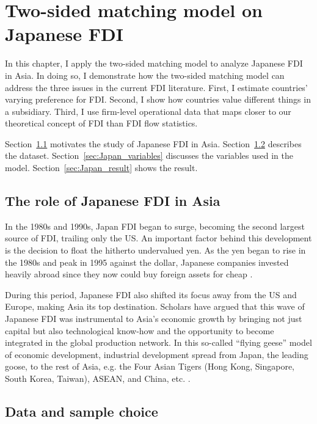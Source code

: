 \chapter{Two-sided matching model on Japanese FDI}
\label{chap:FDI}

In this chapter, I apply the two-sided matching model to analyze Japanese FDI in
Asia. In doing so, I demonstrate how the two-sided matching model can address
the three issues in the current FDI literature. First, I estimate
countries' varying preference for FDI. Second, I show how countries value
different things in a subsidiary. Third, I use firm-level operational data that
maps closer to our theoretical concept of FDI than FDI flow statistics.

Section~\ref{sec:Japan_FDI_in_Asia} motivates the study of Japanese FDI in Asia.
Section~\ref{sec:Japan_sample} describes the dataset.
Section~\ref{sec:Japan_variables} discusses the variables used in the model.
Section~\ref{sec:Japan_result} shows the result.

\section{The role of Japanese FDI in Asia}
\label{sec:Japan_FDI_in_Asia}

In the 1980s and 1990s, Japan FDI began to surge, becoming the second largest
source of FDI, trailing only the US. An important factor behind
this development is the decision to float the hitherto undervalued yen. As the yen began
to rise in the 1980s and peak in 1995 against the dollar,
Japanese companies invested heavily abroad since they now could buy foreign assets
for cheap \citep{Delios2001}.

During this period, Japanese FDI also shifted its focus away from the US and
Europe, making Asia its top destination. Scholars
have argued that this wave of Japanese FDI was instrumental to Asia's
economic growth by bringing not just capital but also technological know-how and
the opportunity to become integrated in the global production network. In this
so-called ``flying geese'' model of economic development, industrial development
spread from Japan, the leading goose, to the rest of Asia, e.g. the Four Asian
Tigers (Hong Kong, Singapore, South Korea, Taiwan), ASEAN, and China, etc.
\citep{Bernard1995, Kojima2000}.

\section{Data and sample choice}
\label{sec:Japan_sample}


